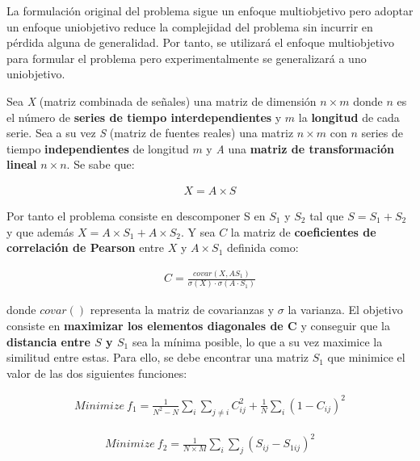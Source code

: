 La formulación original del problema sigue un enfoque multiobjetivo pero adoptar un enfoque uniobjetivo reduce la complejidad del problema sin incurrir en pérdida alguna de generalidad. Por tanto, se utilizará el enfoque multiobjetivo para formular el problema pero experimentalmente se generalizará a uno uniobjetivo.
 
 Sea \textit{X} (matriz combinada de señales) una matriz de dimensión $n\times m$ donde $n$ es el número de \textbf{series de tiempo interdependientes} y $m$ la \textbf{longitud} de cada serie. Sea a su vez \textit{S} (matriz de fuentes reales) una matriz $n\times m$ con $n$ series de tiempo \textbf{independientes} de longitud $m$ y \textit{A} una \textbf{matriz de transformación lineal} $n\times n$. Se sabe que:
 
  \begin{equation}
	 \begin{gathered}
	 	X = A\times S
	 \end{gathered}
 \end{equation}
 
 Por tanto el problema consiste en descomponer S en $S_1$ y $S_2$ tal que $S = S_1 +S_2$ y que además $X = A\times S_1 + A\times S_2$. Y sea $C$ la matriz de \textbf{coeficientes de correlación de Pearson} entre $X$ y $A\times S_1$ definida como:
 
 \begin{equation} \label{eq:covar}
	 \begin{gathered}
	 	C = \frac{covar(X,AS_1)}{\sigma(X)\cdot \sigma (A\cdot S_1)}
	 \end{gathered}
 \end{equation}
 
 donde $covar( )$ representa la matriz de covarianzas y $\sigma$ la varianza.
 El objetivo consiste en \textbf{maximizar los elementos diagonales de C} y conseguir que la \textbf{distancia entre $S$ y $S_1$} sea la mínima posible, lo que a su vez maximice la similitud entre estas. Para ello, se debe encontrar una matriz $S_1$ que minimice el valor de las dos siguientes funciones:
 
  \begin{equation} \label{eq:function1}
	 \begin{gathered}
	 	Minimize \ f_1 = \frac{1}{N^2 -N} \sum_{i}^{} \sum_{j \neq i}^{} C_{ij}^2 + \frac{1}{N} \sum_{i}^{} (1-C_{ij})^2
	 \end{gathered}
 \end{equation}
 
  \begin{equation} \label{eq:function2}
	 \begin{gathered}
	 	Minimize \ f_2 = \frac{1}{N \times M} \sum_{i}^{} \sum_{j}^{} (S_{ij} - S_{1ij})^2
	 \end{gathered}
 \end{equation}
 
